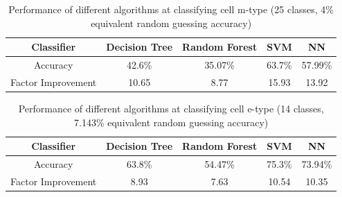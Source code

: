 \documentclass[letterpaper, 10 pt, conference]{ieeeconf}  %
\begin{document}
\begin{table}[h]
    \centering
    \begin{tabular}{|c||c|c|c|c|}
        \hline
        Classifier & Decision Tree & Random Forest & SVM & NN\\
        \hline\hline
        Accuracy & 42.6\% & 35.07\% & 63.7\% &57.99\%\\
        \hline
        Factor Improvement & 10.65 & 8.77 & 15.93 &13.92\\
        \hline
    \end{tabular}
    \caption{Performance of different algorithms at classifying cell m-type (25 classes, 4\% equivalent random guessing accuracy)}
    \label{tbl:mtypeClassifierPerf}
\end{table}

\begin{table}[h]
    \centering
    \begin{tabular}{|c||c|c|c|c|}
        \hline
        Classifier & Decision Tree & Random Forest & SVM & NN\\
        \hline\hline
        Accuracy & 63.8\% & 54.47\% & 75.3\% &73.94\%\\
        \hline
        Factor Improvement & 8.93 & 7.63 & 10.54 &10.35\\
        \hline
    \end{tabular}
    \caption{Performance of different algorithms at classifying cell e-type (14 classes, 7.143\% equivalent random guessing accuracy)}
    \label{tbl:etypeClassifierPerf}
\end{table}

\par
\end{document}
